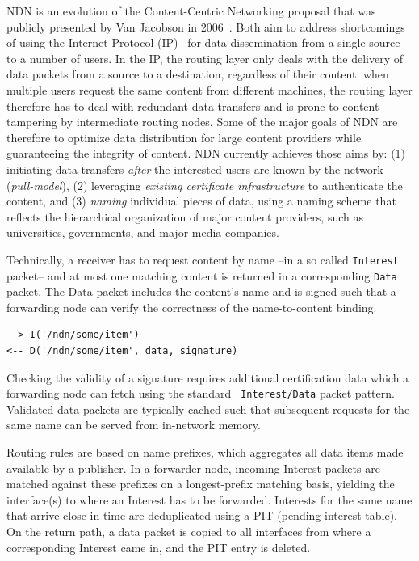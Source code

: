 \documentclass[9pt,sigconf]{acmart}
\begin{document}
NDN is an evolution of the Content-Centric Networking proposal that
was publicly presented by Van Jacobson in
2006~\cite{vanJacobson2006ccn}. Both aim to address shortcomings of
using the Internet Protocol (IP)~\cite{cerf1974protocol} for data
dissemination from a single source to a number of users. In the IP,
the routing layer only deals with the delivery of data packets from a
source to a destination, regardless of their content: when multiple
users request the same content from different machines, the routing
layer therefore has to deal with redundant data transfers and is prone
to content tampering by intermediate routing nodes. Some of the major
goals of NDN are therefore to optimize data distribution for large
content providers while guaranteeing the integrity of content. NDN
currently achieves those aims by: (1) initiating data transfers
\textit{after} the interested users are known by the network
(\textit{pull-model}), (2) leveraging \textit{existing certificate
  infrastructure} to authenticate the content, and (3) \textit{naming}
individual pieces of data, using a naming scheme that reflects the
hierarchical organization of major content providers, such as
universities, governments, and major media companies.

Technically, a receiver has to request content by name --in a so
called {\tt Interest} packet-- and at most one matching content is
returned in a corresponding {\tt Data} packet. The Data packet
includes the content's name and is signed such that a forwarding node
can verify the correctness of the name-to-content binding.

\begin{verbatim}
--> I('/ndn/some/item')
<-- D('/ndn/some/item', data, signature)
\end{verbatim}

Checking the validity of a signature requires additional certification
data which a forwarding node can fetch using the standard {\tt
  Interest/Data} packet pattern. Validated data packets are typically
cached such that subsequent requests for the same name can be served
from in-network memory.

Routing rules are based on name prefixes, which aggregates all data
items made available by a publisher. In a forwarder node, incoming
Interest packets are matched against these prefixes on a
longest-prefix matching basis, yielding the interface(s) to where an
Interest has to be forwarded. Interests for the same name that arrive
close in time are deduplicated using a PIT (pending interest
table). On the return path, a data packet is copied to all interfaces
from where a corresponding Interest came in, and the PIT entry is
deleted.
\end{document}
